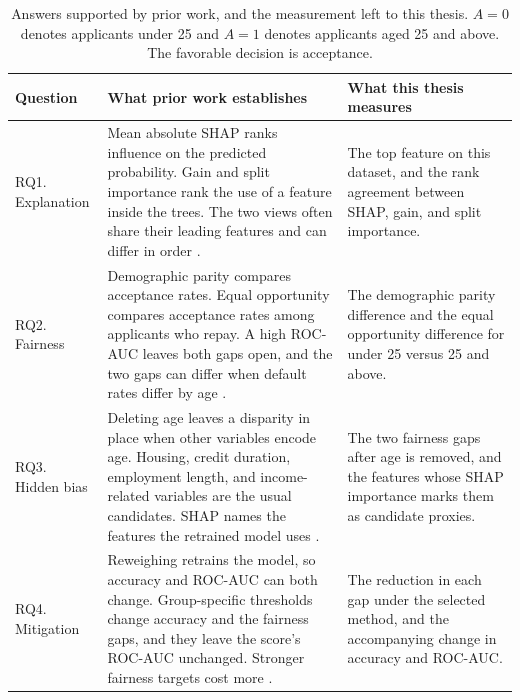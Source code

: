 \begin{table}[H]
  \centering
  \caption{Answers supported by prior work, and the measurement left to this thesis. \(A = 0\) denotes applicants under 25 and \(A = 1\) denotes applicants aged 25 and above. The favorable decision is acceptance.}
  \label{tab:rq-literature}
  \small
  \begin{tabular}{%
    >{\raggedright\arraybackslash}p{2.15cm}%
    >{\raggedright\arraybackslash}p{5.55cm}%
    >{\raggedright\arraybackslash}p{5.45cm}}
    \toprule
    \textbf{Question} & \textbf{What prior work establishes} & \textbf{What this thesis measures} \\
    \midrule
    RQ1. Explanation &
    Mean absolute SHAP ranks influence on the predicted probability. Gain and split importance rank the use of a feature inside the trees. The two views often share their leading features and can differ in order \citep{lundberg2017shap, lundberg2020treeshap, delange2022xai}. &
    The top feature on this dataset, and the rank agreement between SHAP, gain, and split importance. \\
    \addlinespace
    RQ2. Fairness &
    Demographic parity compares acceptance rates. Equal opportunity compares acceptance rates among applicants who repay. A high ROC-AUC leaves both gaps open, and the two gaps can differ when default rates differ by age \citep{hardt2016equality, kozodoi2022fairness}. &
    The demographic parity difference and the equal opportunity difference for under 25 versus 25 and above. \\
    \addlinespace
    RQ3. Hidden bias &
    Deleting age leaves a disparity in place when other variables encode age. Housing, credit duration, employment length, and income-related variables are the usual candidates. SHAP names the features the retrained model uses \citep{pedreschi2008discrimination, kilbertus2017proxy}. &
    The two fairness gaps after age is removed, and the features whose SHAP importance marks them as candidate proxies. \\
    \addlinespace
    RQ4. Mitigation &
    Reweighing retrains the model, so accuracy and ROC-AUC can both change. Group-specific thresholds change accuracy and the fairness gaps, and they leave the score's ROC-AUC unchanged. Stronger fairness targets cost more \citep{kamiran2012reweighing, hardt2016equality, corbettdavies2017cost, kozodoi2022fairness}. &
    The reduction in each gap under the selected method, and the accompanying change in accuracy and ROC-AUC. \\
    \bottomrule
  \end{tabular}
\end{table}

